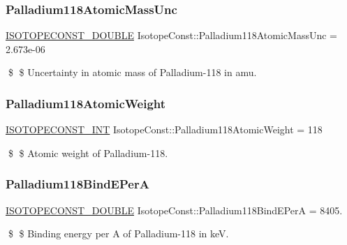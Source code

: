 \subsubsection{\texorpdfstring{Palladium118\+Atomic\+Mass\+Unc}{Palladium118AtomicMassUnc}}
{\footnotesize\ttfamily \mbox{\hyperlink{group___isotope_const-_macros_ga8f45a7272ce02c0b4c65c44636ed719a}{I\+S\+O\+T\+O\+P\+E\+C\+O\+N\+S\+T\+\_\+\+D\+O\+U\+B\+LE}} Isotope\+Const\+::\+Palladium118\+Atomic\+Mass\+Unc = 2.\+673e-\/06}

\$ \$ Uncertainty in atomic mass of Palladium-\/118 in amu. \mbox{\label{group___isotope_const-_palladium-_pd118_ga10a4293902082b8e6ba91dbbd485706d}} 
\subsubsection{\texorpdfstring{Palladium118\+Atomic\+Weight}{Palladium118AtomicWeight}}
{\footnotesize\ttfamily \mbox{\hyperlink{group___isotope_const-_macros_ga5f18360b3e99483a35c32d789e62621c}{I\+S\+O\+T\+O\+P\+E\+C\+O\+N\+S\+T\+\_\+\+I\+NT}} Isotope\+Const\+::\+Palladium118\+Atomic\+Weight = 118}

\$ \$ Atomic weight of Palladium-\/118. \mbox{\label{group___isotope_const-_palladium-_pd118_gac0292212aa7822c805570eee3fbbb010}} 
\subsubsection{\texorpdfstring{Palladium118\+Bind\+E\+PerA}{Palladium118BindEPerA}}
{\footnotesize\ttfamily \mbox{\hyperlink{group___isotope_const-_macros_ga8f45a7272ce02c0b4c65c44636ed719a}{I\+S\+O\+T\+O\+P\+E\+C\+O\+N\+S\+T\+\_\+\+D\+O\+U\+B\+LE}} Isotope\+Const\+::\+Palladium118\+Bind\+E\+PerA = 8405.}

\$ \$ Binding energy per A of Palladium-\/118 in keV. \mbox{\label{group___isotope_const-_palladium-_pd118_ga7fa4114bbb34a341aff2445b7e1b1b67}} 
